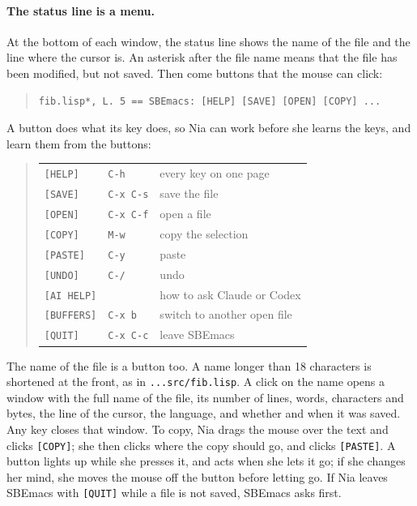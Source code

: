 \documentclass[a4paper,12pt,openany]{book}
\begin{document}
\paragraph{The status line is a menu.} At the bottom of each window,
the status line shows the name of the file and the line where the
cursor is. An asterisk after the file name means that the file has
been modified, but not saved. Then come buttons that the mouse can
click:
\begin{quote}
\begin{verbatim}
fib.lisp*, L. 5 == SBEmacs: [HELP] [SAVE] [OPEN] [COPY] ...
\end{verbatim}
\end{quote}
A button does what its key does, so Nia can work before she
learns the keys, and learn them from the buttons:
\begin{quote}
\begin{tabular}{lll}
\verb|[HELP]|    & \verb|C-h|     & every key on one page\\
\verb|[SAVE]|    & \verb|C-x C-s| & save the file\\
\verb|[OPEN]|    & \verb|C-x C-f| & open a file\\
\verb|[COPY]|    & \verb|M-w|     & copy the selection\\
\verb|[PASTE]|   & \verb|C-y|     & paste\\
\verb|[UNDO]|    & \verb|C-/|     & undo\\
\verb|[AI HELP]| &                & how to ask Claude or Codex\\
\verb|[BUFFERS]| & \verb|C-x b|   & switch to another open file\\
\verb|[QUIT]|    & \verb|C-x C-c| & leave SBEmacs
\end{tabular}
\end{quote}
The name of the file is a button too. A name longer than 18
characters is shortened at the front, as in
\verb|...src/fib.lisp|. A click on the name opens a window with the
full name of the file, its number of lines, words, characters and
bytes, the line of the cursor, the language, and whether and when it
was saved. Any key closes that window.
To copy, Nia drags the mouse over the text and clicks
\verb|[COPY]|; she then clicks where the copy should go, and clicks
\verb|[PASTE]|. A button lights up while she presses it, and acts
when she lets it go; if she changes her mind, she moves the mouse
off the button before letting go. If Nia leaves SBEmacs with
\verb|[QUIT]| while a file is not saved, SBEmacs asks first.
\end{document}
